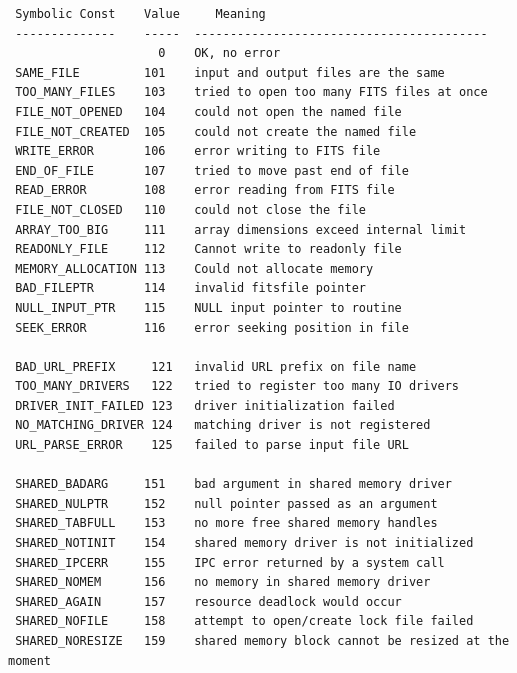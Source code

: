 \documentclass[11pt]{article}
\begin{document}
\begin{verbatim}
 Symbolic Const    Value     Meaning
 --------------    -----  -----------------------------------------
                     0    OK, no error
 SAME_FILE         101    input and output files are the same
 TOO_MANY_FILES    103    tried to open too many FITS files at once
 FILE_NOT_OPENED   104    could not open the named file
 FILE_NOT_CREATED  105    could not create the named file
 WRITE_ERROR       106    error writing to FITS file
 END_OF_FILE       107    tried to move past end of file
 READ_ERROR        108    error reading from FITS file
 FILE_NOT_CLOSED   110    could not close the file
 ARRAY_TOO_BIG     111    array dimensions exceed internal limit
 READONLY_FILE     112    Cannot write to readonly file
 MEMORY_ALLOCATION 113    Could not allocate memory
 BAD_FILEPTR       114    invalid fitsfile pointer
 NULL_INPUT_PTR    115    NULL input pointer to routine
 SEEK_ERROR        116    error seeking position in file

 BAD_URL_PREFIX     121   invalid URL prefix on file name
 TOO_MANY_DRIVERS   122   tried to register too many IO drivers
 DRIVER_INIT_FAILED 123   driver initialization failed
 NO_MATCHING_DRIVER 124   matching driver is not registered
 URL_PARSE_ERROR    125   failed to parse input file URL

 SHARED_BADARG     151    bad argument in shared memory driver
 SHARED_NULPTR     152    null pointer passed as an argument
 SHARED_TABFULL    153    no more free shared memory handles
 SHARED_NOTINIT    154    shared memory driver is not initialized
 SHARED_IPCERR     155    IPC error returned by a system call
 SHARED_NOMEM      156    no memory in shared memory driver
 SHARED_AGAIN      157    resource deadlock would occur
 SHARED_NOFILE     158    attempt to open/create lock file failed
 SHARED_NORESIZE   159    shared memory block cannot be resized at the moment


\end{verbatim}
\end{document}
